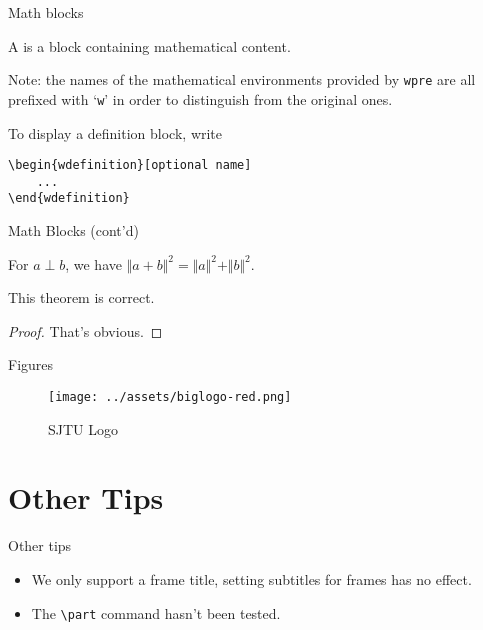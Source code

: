 \documentclass[no-math, aspectratio=1610, 10pt]{beamer}
\begin{document}
    \begin{frame}[fragile]{Math blocks}
        \begin{wdefinition}
            A  is a block containing mathematical content.
        \end{wdefinition}

        \alert{Note:} the names of the mathematical environments provided by \texttt{wpre} are all prefixed with `\texttt{w}' in order to distinguish from the original ones.

        \begin{wexample}
            To display a definition block, write
            \begin{verbatim}
\begin{wdefinition}[optional name]
    ...
\end{wdefinition}\end{verbatim}
        \end{wexample}
    \end{frame}

    \begin{frame}{Math Blocks (cont'd)}
        \begin{wlemma}
            For $a\perp b$, we have $\Vert a + b\Vert^2 = \Vert a\Vert^2 + \Vert b\Vert^2$.
        \end{wlemma}

        \begin{wtheorem}
            This theorem is correct.
        \end{wtheorem}

        \begin{proof}
            That's obvious.
        \end{proof}
    \end{frame}

    \begin{frame}{Figures}
        \begin{figure}
            \texttt{[image: ../assets/biglogo-red.png]}
            \caption{SJTU Logo}
        \end{figure}
    \end{frame}

    \section{Other Tips}

    \begin{frame}[fragile]{Other tips}
        \begin{itemize}
            \item We only support a frame title, setting subtitles for frames has no effect.
            \item The \verb|\part| command hasn't been tested.
        \end{itemize}
    \end{frame}
\end{document}
